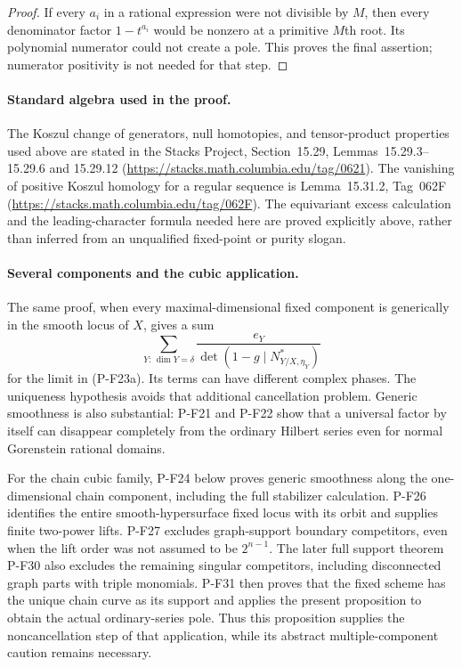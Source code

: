 \documentclass[11pt,a4paper]{article}
\begin{document}
\begin{proof}
If every $a_i$ in a rational expression were not divisible
by $M$, then every denominator factor $1-t^{a_i}$ would
be nonzero at a primitive $M$th root. Its polynomial numerator
could not create a pole. This proves the final assertion;
numerator positivity is not needed for that step.
\end{proof}

\paragraph{Standard algebra used in the proof.}
The Koszul change of generators, null homotopies, and tensor-product
properties used above are stated in the Stacks Project,
Section~15.29, Lemmas~15.29.3--15.29.6 and 15.29.12
(\url{https://stacks.math.columbia.edu/tag/0621}). The vanishing
of positive Koszul homology for a regular sequence is
Lemma~15.31.2, Tag~062F
(\url{https://stacks.math.columbia.edu/tag/062F}). The
equivariant excess calculation and the leading-character formula
needed here are proved explicitly above, rather than inferred
from an unqualified fixed-point or purity slogan.

\paragraph{Several components and the cubic application.}
The same proof, when every maximal-dimensional fixed component
is generically in the smooth locus of $X$, gives a sum
\[
 \sum_{Y:\,\dim Y=\delta}
       \frac{e_Y}{\det(1-g\mid N^*_{Y/X,\eta_Y})}
 \tag{P-F23g}
\]
for the limit in (P-F23a). Its terms can have different complex
phases. The uniqueness hypothesis avoids that additional
cancellation problem. Generic smoothness is also substantial:
P-F21 and P-F22 show that a universal factor by itself can
disappear completely from the ordinary Hilbert series even
for normal Gorenstein rational domains.

For the chain cubic family, P-F24 below proves generic smoothness
along the one-dimensional chain component, including the full
stabilizer calculation. P-F26 identifies the entire smooth-hypersurface
fixed locus with its orbit and supplies finite two-power lifts.
P-F27 excludes graph-support boundary competitors, even when the
lift order was not assumed to be $2^{n-1}$. The later full support
theorem P-F30 also excludes the remaining singular competitors,
including disconnected graph parts with triple monomials. P-F31
then proves that the fixed scheme has the unique chain curve as
its support and applies the present proposition to obtain the
actual ordinary-series pole. Thus this proposition supplies the
noncancellation step of that application, while its abstract
multiple-component caution remains necessary.
\end{document}
